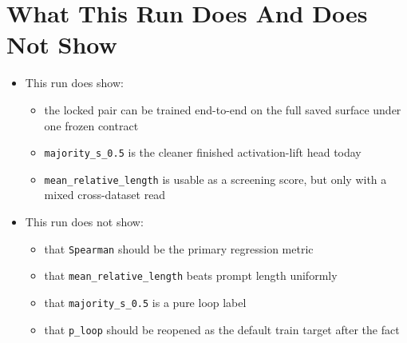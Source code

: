 \documentclass[11pt]{article}
\begin{document}
\section*{What This Run Does And Does Not Show}
\begin{itemize}[leftmargin=1.5em]
\item This run does show:
  \begin{itemize}[leftmargin=1.5em]
  \item the locked pair can be trained end-to-end on the full saved surface under one frozen contract
  \item \texttt{majority\_s\_0.5} is the cleaner finished activation-lift head today
  \item \texttt{mean\_relative\_length} is usable as a screening score, but only with a mixed cross-dataset read
  \end{itemize}
\item This run does not show:
  \begin{itemize}[leftmargin=1.5em]
  \item that \texttt{Spearman} should be the primary regression metric
  \item that \texttt{mean\_relative\_length} beats prompt length uniformly
  \item that \texttt{majority\_s\_0.5} is a pure loop label
  \item that \texttt{p\_loop} should be reopened as the default train target after the fact
  \end{itemize}
\end{itemize}
\end{document}
